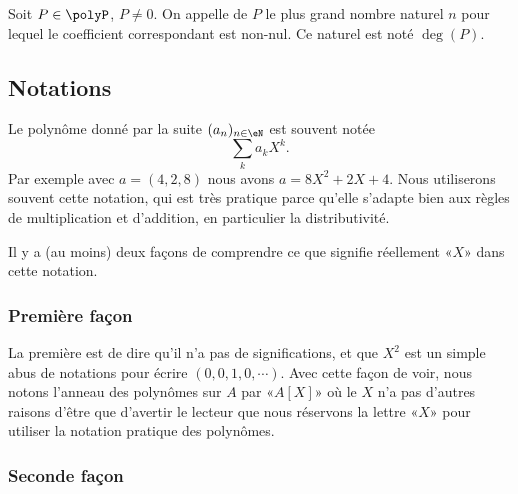 \begin{definition}  \label{DefDegrePoly}
    Soit \( P \in \polyP\), \( P \neq 0 \). On appelle  de $P$ le plus grand nombre naturel $n$ pour lequel le coefficient correspondant est non-nul. Ce naturel est noté \( \deg(P) \).
\end{definition}

\subsection{Notations}
\label{SUBSECooLEKVooFBPSJz}

Le polynôme donné par la suite \( (a_n)_{n\in \eN}\) est souvent notée
\begin{equation}
    \sum_ka_kX^k.
\end{equation}
Par exemple avec \( a=(4,2,8)\) nous avons \( a=8X^2+2X+4\). Nous utiliserons souvent cette notation, qui est très pratique parce qu'elle s'adapte bien aux règles de multiplication et d'addition, en particulier la distributivité.

Il y a (au moins) deux façons de comprendre ce que signifie réellement «\( X\)» dans cette notation.

\subsubsection{Première façon}

La première est de dire qu'il n'a pas de significations, et que \( X^2\) est un simple abus de notations pour écrire \( (0,0,1,0,\cdots)\). Avec cette façon de voir, nous notons l'anneau des polynômes sur \( A\) par «\( A[X]\)» où le \( X\) n'a pas d'autres raisons d'être que d'avertir le lecteur que nous réservons la lettre «\( X\)» pour utiliser la notation pratique des polynômes.

\subsubsection{Seconde façon}
\label{SUBSUBSECooPNBYooWXEHrg}

